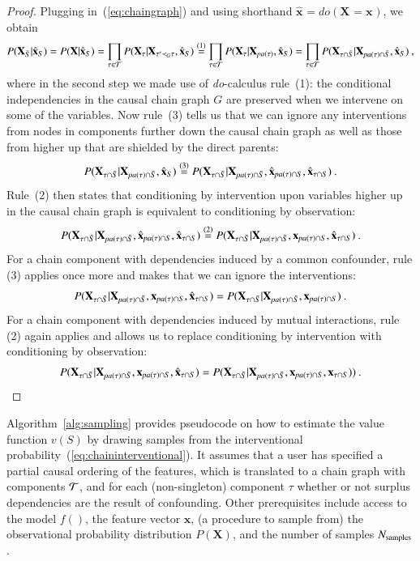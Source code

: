 \documentclass{article}
\newcommand{\vX}{\mathbf{X}}
\newcommand{\vx}{\mathbf{x}}
\newcommand{\val}{{v}}
\newcommand{\dodo}{\mathit{do}}
\newcommand{\lvdo}[1]{\dodo(\vX_{#1} = \vx_{#1})}
\newcommand{\svdo}[1]{\hat{\vx}_{#1}}
\newcommand{\spa}{\mathop{\textit{\scriptsize pa}}}
\newcommand{\onder}[2]{{#1}_{\mbox{\scriptsize #2}}}
\newcommand{\chaincomponents}{{\cal T}}
\newcommand{\isequaldono}[1]{\overset{(#1)}{=}}
\begin{document}
\begin{proof}
Plugging in~(\ref{eq:chaingraph}) and using shorthand $\svdo{} = \lvdo{}$, we obtain
\[
P(\vX_{\bar{S}}|\svdo{S}) = P(\vX|\svdo{S}) = \prod_{\tau \in \chaincomponents} P(\vX_{\tau}|\vX_{\tau' \prec_G \tau},\svdo{S})
\isequaldono{1} \prod_{\tau \in \chaincomponents} P(\vX_\tau|\vX_{\spa(\tau)},\svdo{S}) = \prod_{\tau \in \chaincomponents} P(\vX_{\tau \cap \bar{S}}|\vX_{\spa(\tau)  \cap \bar{S}},\svdo{S}) \: ,
\]
where in the second step we made use of {\em do}-calculus rule~(1): the conditional independencies in the causal chain graph $G$ are preserved when we intervene on some of the variables. Now rule~(3) tells us that we can ignore any interventions from nodes in components further down the causal chain graph as well as those from higher up that are shielded by the direct parents:
\[
P(\vX_{\tau \cap \bar{S}}|\vX_{\spa(\tau)  \cap \bar{S}},\svdo{S})
\isequaldono{3} P(\vX_{\tau \cap \bar{S}}|\vX_{\spa(\tau)  \cap \bar{S}},\svdo{\spa(\tau) \cap S},\svdo{\tau \cap S}) \: .
\]
Rule~(2) then states that conditioning by intervention upon variables higher up in the causal chain graph is equivalent to conditioning by observation:
\[
P(\vX_{\tau \cap \bar{S}}|\vX_{\spa(\tau)  \cap \bar{S}},\svdo{\spa(\tau) \cap S},\svdo{\tau \cap S}) \isequaldono{2}
P(\vX_{\tau \cap \bar{S}}|\vX_{\spa(\tau)  \cap \bar{S}},\vx_{\spa(\tau) \cap S},\svdo{\tau \cap S}) \: .
\]
For a chain component with dependencies induced by a common confounder, rule (3) applies once more and makes that we can ignore the interventions:
\[
P(\vX_{\tau \cap \bar{S}}|\vX_{\spa(\tau)  \cap \bar{S}},\vx_{\spa(\tau) \cap S},\svdo{\tau \cap S}) = P(\vX_{\tau \cap \bar{S}}|\vX_{\spa(\tau)  \cap \bar{S}},\vx_{\spa(\tau) \cap S}) \: .
\]
For a chain component with dependencies induced by mutual interactions, rule (2) again applies and allows us to replace conditioning by intervention with conditioning by observation:
\[
P(\vX_{\tau \cap \bar{S}}|\vX_{\spa(\tau)  \cap \bar{S}},\vx_{\spa(\tau) \cap S},\svdo{\tau \cap S}) = P(\vX_{\tau \cap \bar{S}}|\vX_{\spa(\tau)  \cap \bar{S}},\vx_{ \spa(\tau) \cap S},\vx_{\tau \cap S})) \: .
\]
\end{proof}

Algorithm~\ref{alg:sampling} provides pseudocode on how to estimate the value function $\val(S)$ by drawing samples from the interventional probability~(\ref{eq:chaininterventional}). It assumes that a user has specified a partial causal ordering of the features, which is translated to a chain graph with components $\chaincomponents$, and for each (non-singleton) component $\tau$ whether or not surplus dependencies are the result of confounding. Other prerequisites include access to the model $f()$, the feature vector $\vx$, (a procedure to sample from) the observational probability distribution $P(\vX)$, and the number of samples $\onder{N}{samples}$.
\end{document}
